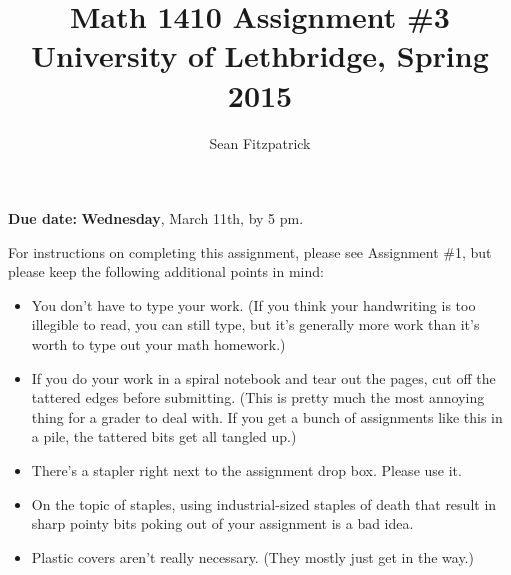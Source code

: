 \documentclass[letterpaper,12pt]{article}
\title{Math 1410 Assignment \#3\\University of Lethbridge, Spring 2015}
\author{Sean Fitzpatrick}
\begin{document}
 \maketitle

{\bf Due date:} {\bf Wednesday}, March 11th, by 5 pm.

\bigskip

For instructions on completing this assignment, please see Assignment \#1, but please keep the following additional points in mind:
\begin{itemize}
 \item You don't have to type your work. (If you think your handwriting is too illegible to read, you can still type, but it's generally more work than it's worth to type out your math homework.)
 \item If you do your work in a spiral notebook and tear out the pages, cut off the tattered edges before submitting. (This is pretty much the most annoying thing for a grader to deal with. If you get a bunch of assignments like this in a pile, the tattered bits get all tangled up.)
 \item There's a stapler right next to the assignment drop box. Please use it.
 \item On the topic of staples, using industrial-sized staples of death that result in sharp pointy bits poking out of your assignment is a bad idea.
 \item Plastic covers aren't really necessary. (They mostly just get in the way.)
\end{itemize}
\end{document}
